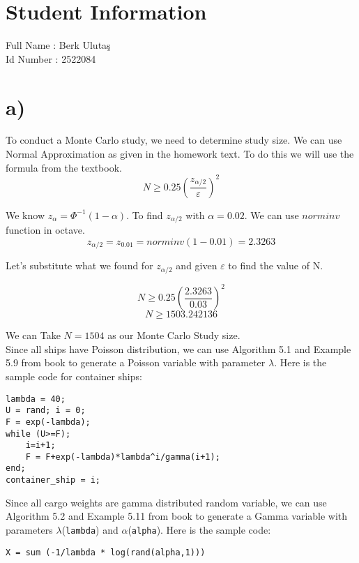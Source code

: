 \documentclass[12pt]{article}
\begin{document}
\section*{Student Information } 
Full Name : Berk Ulutaş \\
Id Number : 2522084 \\

\section*{a)}
To conduct a Monte Carlo study, we need to determine study size. We can use Normal Approximation as given in the homework text. To do this we will use the formula from the textbook.
$$N \geq 0.25 (\dfrac{z_{\alpha/2}}{\varepsilon})^2$$

We know $z_\alpha = \Phi^{-1}(1-\alpha)$. To find $z_{\alpha/2}$ with $\alpha = 0.02$. We can use $norminv$ function in octave. $$ z_{\alpha/2}= z_{0.01} = norminv(1-0.01) = 2.3263$$

Let's substitute what we found for $z_{\alpha/2}$ and given $\varepsilon$ to find the value of N.

$$N \geq 0.25 (\frac{2.3263}{0.03})^2$$
$$N \geq 1503.242136$$

We can Take $N = 1504 $ as our Monte Carlo Study size. \\

Since all ships have Poisson distribution, we can use Algorithm 5.1 and Example 5.9 from book to generate a Poisson variable with parameter $\lambda$. Here is the sample code for container ships: \\

\begin{lstlisting}[style=Matlab-editor]
% container ships
lambda = 40;
U = rand; i = 0;
F = exp(-lambda);
while (U>=F);
    i=i+1;
    F = F+exp(-lambda)*lambda^i/gamma(i+1);
end;
container_ship = i;
\end{lstlisting}


Since all cargo weights are gamma distributed random variable, we can use Algorithm 5.2 and Example 5.11 from book to generate a Gamma variable with parameters $\lambda$(\texttt{lambda}) and $\alpha$(\texttt{alpha}). Here is the sample code: \\

\begin{lstlisting}[style=Matlab-editor]
X = sum (-1/lambda * log(rand(alpha,1)))
\end{lstlisting}
\end{document}
